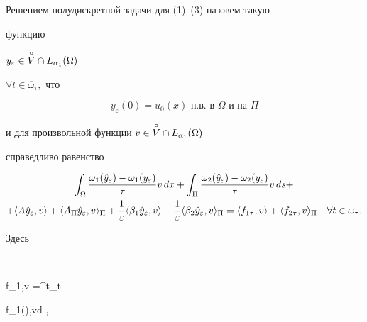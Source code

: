 \begin{defn} 


Решением полудискретной задачи для (1)--(3) назовем такую 


функцию \linebreak




$y_{\varepsilon}\in \overset{\circ} V \cap L_{\alpha_1}(\Omega)$


$\forall t\in \overline \omega_{\tau},$ что 


\begin{equation} 


y_{\varepsilon}(0) = u_0(x)\text{ п.в. в }\Omega \text{ и на }\Pi 


\end{equation} 


и для произвольной функции $v\in \overset{\circ} V \cap L_{\alpha_1}(\Omega)$ 


справедливо равенство 


\begin{gather} 


\int_{\Omega}\frac{\omega_1(\Hat y_{\varepsilon})-\omega_1(y_{\varepsilon})} 


{\tau}v\,dx+ 


\int_{\Pi} 


\frac{\omega_2(\Hat y_{\varepsilon})-\omega_2(y_{\varepsilon})}


{\tau}v\,ds+\notag \\ 


+\langle A\Hat y_{\varepsilon},v\rangle+ 


\langle A_\Pi \Hat y_{\varepsilon},v\rangle_\Pi+\frac{1}{\varepsilon} 


\langle \beta_1\Hat y_{\varepsilon},v\rangle +


\frac{1}{\varepsilon}\langle \beta_2\Hat y_{\varepsilon},v\rangle_\Pi 


=\langle f_{1\tau},v\rangle +\langle f_{2\tau},v \rangle_\Pi 


\quad \forall t \in \omega_\tau.


\end{gather} 


\end{defn} 


Здесь 


$$ 


\langle f_{1\tau},v \rangle =\int^t_{t-\tau} 


\langle f_1(\xi),v\rangle d \xi, \qquad 


